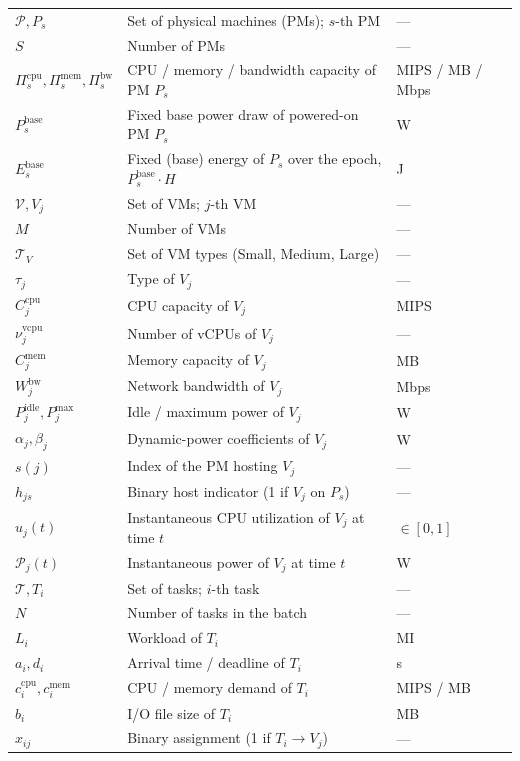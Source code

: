 \documentclass[11pt,a4paper]{article}
\begin{document}
\begin{longtable}{p{4.5cm} p{9.5cm} p{2.5cm}}
$\mathcal{P}, P_s$ & Set of physical machines (PMs); $s$-th PM & --- \\
$S$ & Number of PMs & --- \\
$\Pi^{\text{cpu}}_s, \Pi^{\text{mem}}_s, \Pi^{\text{bw}}_s$ & CPU / memory / bandwidth capacity of PM $P_s$ & MIPS / MB / Mbps \\
$P^{\text{base}}_s$ & Fixed base power draw of powered-on PM $P_s$ & W \\
$E^{\text{base}}_s$ & Fixed (base) energy of $P_s$ over the epoch, $P^{\text{base}}_s \cdot H$ & J \\
$\mathcal{V}, V_j$ & Set of VMs; $j$-th VM & --- \\
$M$ & Number of VMs & --- \\
$\mathcal{T}_V$ & Set of VM types (Small, Medium, Large) & --- \\
$\tau_j$ & Type of $V_j$ & --- \\
$C^{\text{cpu}}_j$ & CPU capacity of $V_j$ & MIPS \\
$\nu^{\text{vcpu}}_j$ & Number of vCPUs of $V_j$ & --- \\
$C^{\text{mem}}_j$ & Memory capacity of $V_j$ & MB \\
$W^{\text{bw}}_j$ & Network bandwidth of $V_j$ & Mbps \\
$P^{\text{idle}}_j, P^{\text{max}}_j$ & Idle / maximum power of $V_j$ & W \\
$\alpha_j, \beta_j$ & Dynamic-power coefficients of $V_j$ & W \\
$s(j)$ & Index of the PM hosting $V_j$ & --- \\
$h_{js}$ & Binary host indicator (1 if $V_j$ on $P_s$) & --- \\
$u_j(t)$ & Instantaneous CPU utilization of $V_j$ at time $t$ & $\in [0,1]$ \\
$\mathcal{P}_j(t)$ & Instantaneous power of $V_j$ at time $t$ & W \\
$\mathcal{T}, T_i$ & Set of tasks; $i$-th task & --- \\
$N$ & Number of tasks in the batch & --- \\
$L_i$ & Workload of $T_i$ & MI \\
$a_i, d_i$ & Arrival time / deadline of $T_i$ & s \\
$c^{\text{cpu}}_i, c^{\text{mem}}_i$ & CPU / memory demand of $T_i$ & MIPS / MB \\
$b_i$ & I/O file size of $T_i$ & MB \\
$x_{ij}$ & Binary assignment (1 if $T_i \to V_j$) & --- \\

\end{longtable}
\end{document}
